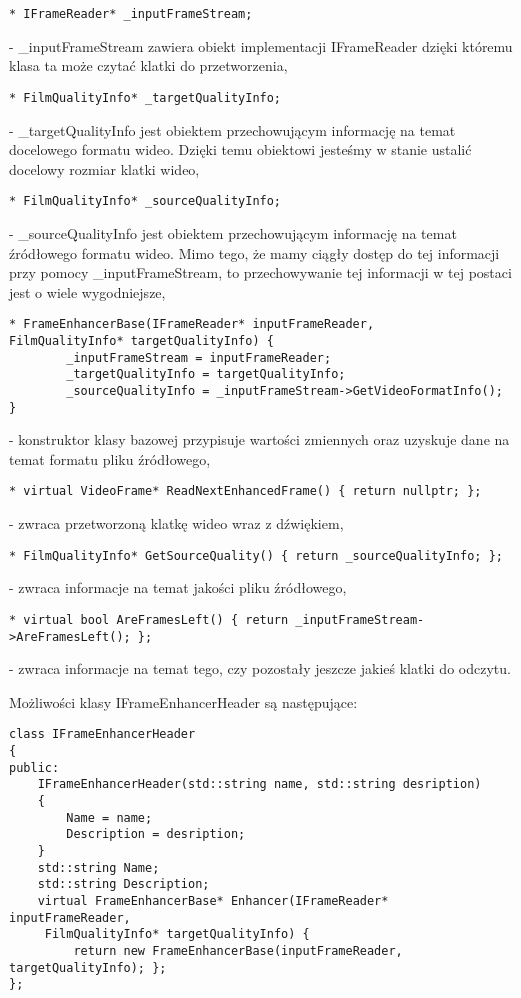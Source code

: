 \documentclass[twoside]{projektInzynierskiMS}
\begin{document}
\begin{verbatim}
* IFrameReader* _inputFrameStream;
\end{verbatim}
- \_inputFrameStream zawiera obiekt implementacji IFrameReader dzięki któremu klasa ta może czytać klatki do przetworzenia,
\begin{verbatim}
* FilmQualityInfo* _targetQualityInfo;
\end{verbatim}
 - \_targetQualityInfo jest obiektem przechowującym informację na temat docelowego formatu wideo. Dzięki temu obiektowi jesteśmy w stanie ustalić docelowy rozmiar klatki wideo,
\begin{verbatim}
* FilmQualityInfo* _sourceQualityInfo;
\end{verbatim}
- \_sourceQualityInfo jest obiektem przechowującym informację na temat źródłowego formatu wideo. Mimo tego, że mamy ciągły dostęp do tej informacji przy pomocy \_inputFrameStream, to przechowywanie tej informacji w tej postaci jest o wiele wygodniejsze,
\begin{verbatim}
* FrameEnhancerBase(IFrameReader* inputFrameReader, 
FilmQualityInfo* targetQualityInfo) {
        _inputFrameStream = inputFrameReader;
        _targetQualityInfo = targetQualityInfo;
        _sourceQualityInfo = _inputFrameStream->GetVideoFormatInfo();
}
\end{verbatim}
- konstruktor klasy bazowej przypisuje wartości zmiennych oraz uzyskuje dane na temat formatu pliku źródłowego,
\begin{verbatim}
* virtual VideoFrame* ReadNextEnhancedFrame() { return nullptr; };
\end{verbatim}
- zwraca przetworzoną klatkę wideo wraz z dźwiękiem,
\begin{verbatim}
* FilmQualityInfo* GetSourceQuality() { return _sourceQualityInfo; };
\end{verbatim}
- zwraca informacje na temat jakości pliku źródłowego,
\begin{verbatim}
* virtual bool AreFramesLeft() { return _inputFrameStream->AreFramesLeft(); };
\end{verbatim}
- zwraca informacje na temat tego, czy pozostały jeszcze jakieś klatki do odczytu.


Możliwości klasy IFrameEnhancerHeader są następujące:
\begin{verbatim}
class IFrameEnhancerHeader
{
public:
	IFrameEnhancerHeader(std::string name, std::string desription)
	{
		Name = name;
		Description = desription;
	}
	std::string Name;
	std::string Description;
	virtual FrameEnhancerBase* Enhancer(IFrameReader* inputFrameReader,
	 FilmQualityInfo* targetQualityInfo) { 
	     return new FrameEnhancerBase(inputFrameReader, targetQualityInfo); };
};
\end{verbatim}
\end{document}
